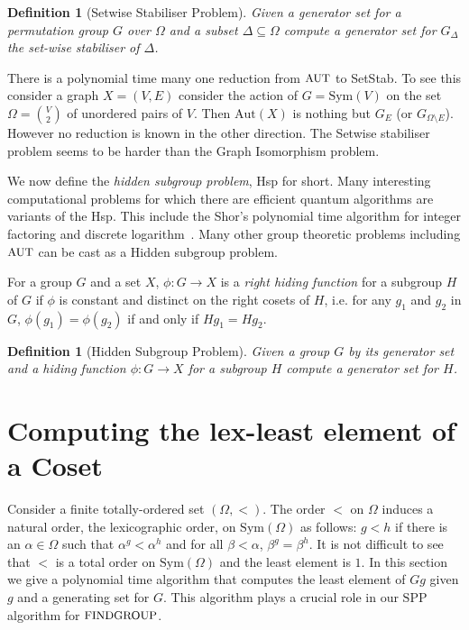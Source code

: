 \documentclass[11pt]{madras}%
\newtheorem{definition}[theorem]{Definition}
\theoremstyle{remark}
\newcommand{\Aut}[1]{{\ensuremath{\mathrm{Aut}\left(#1\right)}}}
\newcommand{\Sym}[1]{{\ensuremath{\mathrm{Sym}\left(#1\right)}}}
\newcommand{\ProblemFont}[1]{{\ensuremath{\textrm{\small #1}}}}
\begin{document}
\begin{definition}[Setwise Stabiliser Problem]
  Given a generator set for a permutation group $G$ over $\Omega$ and
  a subset $\Delta \subseteq \Omega$ compute a generator set for
  $G_\Delta$ the set-wise stabiliser of $\Delta$.
\end{definition}
 
There is a polynomial time many one reduction from $\ProblemFont{AUT}$
to {\sc SetStab}. To see this consider a graph $X = (V,E)$ consider
the action of $G = \Sym{V}$ on the set $\Omega = {V \choose 2}$ of
unordered pairs of $V$. Then $\Aut{X}$ is nothing but $G_{E}$ (or
$G_{\Omega \setminus E}$). However no reduction is known in the other
direction. The Setwise stabiliser problem seems to be harder than the
Graph Isomorphism problem.

We now define the \emph{hidden subgroup problem}, {\sc Hsp} for short.
Many interesting computational problems for which there are efficient
quantum algorithms are variants of the {\sc Hsp}. This include the
Shor's polynomial time algorithm for integer factoring and discrete
logarithm~\cite{shor97factoring}. Many other group theoretic problems
including $\ProblemFont{AUT}$ can be cast as a Hidden subgroup problem.

For a group $G$ and a set $X$, $\phi : G \to X$ is a \emph{right
  hiding function} for a subgroup $H$ of $G$ if $\phi$ is constant and
distinct on the right cosets of $H$, i.e.  for any $g_1$ and $g_2$ in
$G$, $\phi(g_1) = \phi(g_2)$ if and only if $Hg_1 = Hg_2$. 

\begin{definition}[Hidden Subgroup Problem]
  Given a group $G$ by its generator set and a hiding function $\phi:
  G \to X$ for a subgroup $H$ compute a generator set for $H$.
\end{definition}

\section{Computing the lex-least element of a Coset}

Consider a finite totally-ordered set $(\Omega,<)$. The order $<$ on
$\Omega$ induces a natural order, the lexicographic order, on
$\Sym{\Omega}$ as follows: $g < h$ if there is an $\alpha \in \Omega$
such that $\alpha^g < \alpha^h$ and for all $\beta < \alpha$, $\beta^g
= \beta^h$. It is not difficult to see that $<$ is a total order on
$\Sym{\Omega}$ and the least element is $1$. In this section we give a
polynomial time algorithm that computes the least element of $Gg$
given $g$ and a generating set for $G$. This algorithm plays a crucial
role in our $\mathrm{SPP}$ algorithm for $\ProblemFont{FINDGROUP}$.
\end{document}
